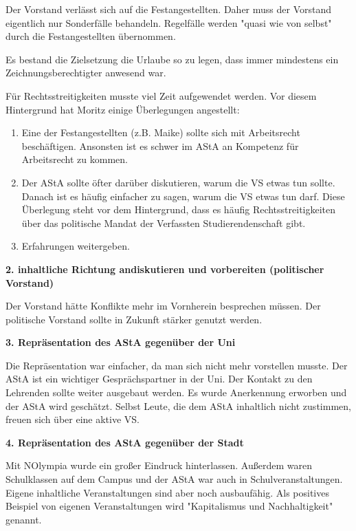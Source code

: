 \documentclass[ngerman,headheight=70pt]{scrartcl}
\begin{document}
    Der Vorstand verlässt sich auf die Festangestellten. Daher muss der Vorstand
    eigentlich nur Sonderfälle behandeln. Regelfälle werden "quasi wie von selbst"
    durch die Festangestellten übernommen.

    Es bestand die Zielsetzung die Urlaube so zu legen, dass immer mindestens ein
    Zeichnungsberechtigter anwesend war.

    Für Rechtsstreitigkeiten musste viel Zeit aufgewendet werden. Vor diesem
    Hintergrund hat Moritz einige Überlegungen angestellt:

    \begin{enumerate}
        \item Eine der Festangestellten (z.B. Maike) sollte sich mit
        Arbeitsrecht beschäftigen. Ansonsten ist es schwer im AStA an Kompetenz
        für Arbeitsrecht zu kommen.
        \item Der AStA sollte öfter darüber diskutieren, warum die VS etwas tun
        sollte. Danach ist es häufig einfacher zu sagen, warum die VS etwas tun
        darf. Diese Überlegung steht vor dem Hintergrund, dass es häufig
        Rechtsstreitigkeiten über das politische Mandat der Verfassten Studierendenschaft
        gibt.
        \item Erfahrungen weitergeben.
    \end{enumerate}

    \textbf{2. inhaltliche Richtung andiskutieren und vorbereiten (politischer
    Vorstand)}

    Der Vorstand hätte Konflikte mehr im Vornherein besprechen müssen.
    Der politische Vorstand sollte in Zukunft stärker genutzt werden.

    \textbf{3. Repräsentation des AStA gegenüber der Uni}

    Die Repräsentation war einfacher, da man sich nicht mehr vorstellen musste.
    Der AStA ist ein wichtiger Gesprächspartner in der Uni. Der Kontakt zu den
    Lehrenden sollte weiter ausgebaut werden. Es wurde Anerkennung erworben und
    der AStA wird geschätzt. Selbst Leute, die dem AStA inhaltlich nicht
    zustimmen, freuen sich über eine aktive VS.

    \textbf{4. Repräsentation des AStA gegenüber der Stadt}

    Mit NOlympia wurde ein großer Eindruck hinterlassen. Außerdem waren
    Schulklassen auf dem Campus und der AStA war auch in Schulveranstaltungen.
    Eigene inhaltliche Veranstaltungen sind aber noch ausbaufähig.
    Als positives Beispiel von eigenen Veranstaltungen wird "Kapitalismus und
    Nachhaltigkeit" genannt.
\end{document}
